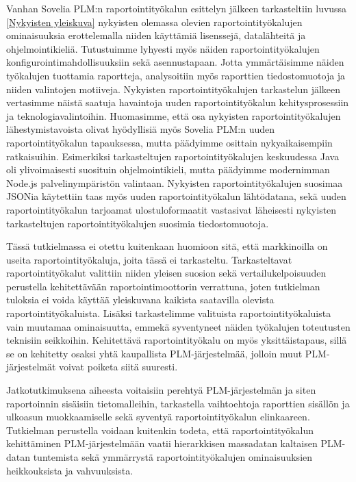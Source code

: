 Vanhan Sovelia PLM:n raportointityökalun esittelyn jälkeen tarkasteltiin luvussa \ref{Nykyisten yleiskuva} nykyisten olemassa olevien raportointityökalujen ominaisuuksia erottelemalla niiden käyttämiä lisenssejä, datalähteitä ja ohjelmointikieliä. Tutustuimme lyhyesti myös näiden raportointityökalujen konfigurointimahdollisuuksiin sekä asennustapaan. Jotta ymmärtäisimme näiden työkalujen tuottamia raportteja, analysoitiin myös raporttien tiedostomuotoja ja niiden valintojen motiiveja. Nykyisten raportointityökalujen tarkastelun jälkeen vertasimme näistä saatuja havaintoja uuden raportointityökalun kehitysprosessiin ja teknologiavalintoihin. Huomasimme, että osa nykyisten raportointityökalujen lähestymistavoista olivat hyödyllisiä myös Sovelia PLM:n uuden raportointityökalun tapauksessa, mutta päädyimme osittain nykyaikaisempiin ratkaisuihin. Esimerkiksi tarkasteltujen raportointityökalujen keskuudessa Java oli ylivoimaisesti suosituin ohjelmointikieli, mutta päädyimme modernimman Node.js palvelinympäristön valintaan. Nykyisten raportointityökalujen suosimaa JSONia käytettiin taas myös uuden raportointityökalun lähtödatana, sekä uuden raportointityökalun tarjoamat ulostuloformaatit vastasivat läheisesti nykyisten tarkasteltujen raportointityökalujen suosimia tiedostomuotoja.

Tässä tutkielmassa ei otettu kuitenkaan huomioon sitä, että markkinoilla on useita raportointityökaluja, joita tässä ei tarkasteltu. Tarkasteltavat raportointityökalut valittiin niiden yleisen suosion sekä vertailukelpoisuuden perustella kehitettävään raportointimoottorin verrattuna, joten tutkielman tuloksia ei voida käyttää yleiskuvana kaikista saatavilla olevista raportointityökaluista. Lisäksi tarkastelimme valituista raportointityökaluista vain muutamaa ominaisuutta, emmekä syventyneet näiden työkalujen toteutusten teknisiin seikkoihin. Kehitettävä raportointityökalu on myös yksittäistapaus, sillä se on kehitetty osaksi yhtä kaupallista PLM-järjestelmää, jolloin muut PLM-järjestelmät voivat poiketa siitä suuresti.

Jatkotutkimuksena aiheesta voitaisiin perehtyä PLM-järjestelmän ja siten raportoinnin sisäisiin tietomalleihin, tarkastella vaihtoehtoja raporttien sisällön ja ulkoasun muokkaamiselle sekä syventyä raportointityökalun elinkaareen. Tutkielman perustella voidaan kuitenkin todeta, että raportointityökalun kehittäminen PLM-järjestelmään vaatii hierarkkisen massadatan kaltaisen PLM-datan tuntemista sekä ymmärrystä raportointityökalujen ominaisuuksien heikkouksista ja vahvuuksista.

